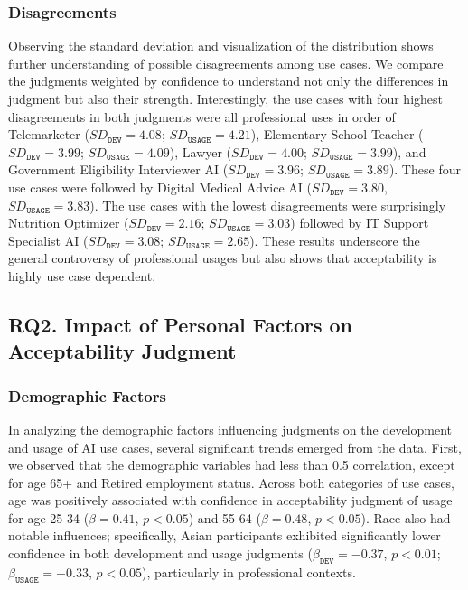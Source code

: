 \subsubsection{Disagreements}
Observing the standard deviation and visualization of the distribution shows further understanding of possible disagreements among use cases. We compare the judgments weighted by confidence to understand not only the differences in judgment but also their strength. Interestingly, the use cases with four highest disagreements in both judgments were all professional uses in order of Telemarketer ($SD_{\texttt{DEV}}=4.08$; $SD_{\texttt{USAGE}}=4.21$), Elementary School Teacher ($SD_{\texttt{DEV}}=3.99$; $SD_{\texttt{USAGE}}=4.09$), Lawyer ($SD_{\texttt{DEV}}=4.00$; $SD_{\texttt{USAGE}}=3.99$), and Government Eligibility Interviewer AI ($SD_{\texttt{DEV}}=3.96$; $SD_{\texttt{USAGE}}=3.89$). These four use cases were followed by Digital Medical Advice AI ($SD_{\texttt{DEV}}=3.80$, $SD_{\texttt{USAGE}}=3.83$). The use cases with the lowest disagreements were surprisingly Nutrition Optimizer ($SD_{\texttt{DEV}}=2.16$; $SD_{\texttt{USAGE}}=3.03$) followed by IT Support Specialist AI ($SD_{\texttt{DEV}}=3.08$; $SD_{\texttt{USAGE}}=2.65$). These results underscore the general controversy of professional usages but also shows that acceptability is highly use case dependent. 

% 
% 

\subsection{RQ2. Impact of Personal Factors on Acceptability Judgment}
\label{sec:RQ2}
\subsubsection{Demographic Factors}
% 
% 

In analyzing the demographic factors influencing judgments on the development and usage of AI use cases, several significant trends emerged from the data. First, we observed that the demographic variables had less than 0.5 correlation, except for age 65+ and Retired employment status. Across both categories of use cases, age was positively associated with confidence in acceptability judgment of usage for age 25-34 ($\beta=0.41$, $p<0.05$) and 55-64 ($\beta = 0.48$, $p<0.05$). Race also had notable influences; specifically, Asian participants exhibited significantly lower confidence in both development and usage judgments ($\beta_{\texttt{DEV}} = -0.37$, $p<0.01$; $\beta_{\texttt{USAGE}} = -0.33$, $p<0.05$), particularly in professional contexts. 

